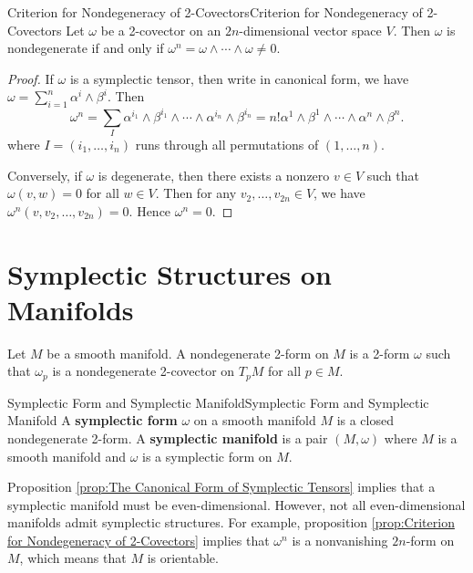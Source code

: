\documentclass[../main.tex]{subfiles}
\begin{document}
\begin{proposition}{Criterion for Nondegeneracy of 2-Covectors}{Criterion for Nondegeneracy of 2-Covectors}
  Let $\omega$ be a 2-covector on an $2n$-dimensional vector space $V$. Then $\omega$ is nondegenerate if and only if $\omega^n = \omega \wedge \cdots \wedge \omega \neq 0$.
\end{proposition}
\begin{proof}
  If $\omega$ is a symplectic tensor, then write in canonical form, we have $\omega = \sum_{i=1}^n \alpha^i \wedge \beta^i$. Then
  \begin{equation*}
    \omega^n = \sum_I \alpha^{i_1} \wedge \beta^{i_1} \wedge \cdots \wedge \alpha^{i_n} \wedge \beta^{i_n} = n! \alpha^1 \wedge \beta^1 \wedge \cdots \wedge \alpha^n \wedge \beta^n.
  \end{equation*}
  where $I = (i_1, \dots, i_n)$ runs through all permutations of $(1, \dots, n)$.

  Conversely, if $\omega$ is degenerate, then there exists a nonzero $v\in V$ such that $\omega(v, w) = 0$ for all $w\in V$. Then for any $v_2, \dots, v_{2n} \in V$, we have $\omega^n(v, v_2, \dots, v_{2n}) = 0$. Hence $\omega^n = 0$.
\end{proof}

\section{Symplectic Structures on Manifolds}
Let $M$ be a smooth manifold. A nondegenerate 2-form on $M$ is a 2-form $\omega$ such that $\omega_p$ is a nondegenerate 2-covector on $T_p M$ for all $p\in M$.

\begin{definition}{Symplectic Form and Symplectic Manifold}{Symplectic Form and Symplectic Manifold}
  A \textbf{symplectic form} $\omega$ on a smooth manifold $M$ is a closed nondegenerate 2-form. A \textbf{symplectic manifold} is a pair $(M, \omega)$ where $M$ is a smooth manifold and $\omega$ is a symplectic form on $M$.
\end{definition}

Proposition \ref{prop:The Canonical Form of Symplectic Tensors} implies that a symplectic manifold must be even-dimensional. However, not all even-dimensional manifolds admit symplectic structures. For example, proposition \ref{prop:Criterion for Nondegeneracy of 2-Covectors} implies that $\omega^n$ is a nonvanishing $2n$-form on $M$, which means that $M$ is orientable.
\end{document}
